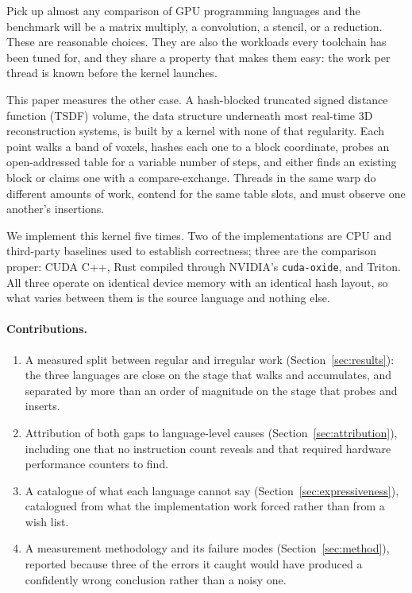 \documentclass[11pt]{article}
\begin{document}
Pick up almost any comparison of GPU programming languages and the benchmark
will be a matrix multiply, a convolution, a stencil, or a reduction. These are
reasonable choices. They are also the workloads every toolchain has been tuned
for, and they share a property that makes them easy: the work per thread is
known before the kernel launches.

This paper measures the other case. A hash-blocked truncated signed distance
function (TSDF) volume, the data structure underneath most real-time 3D
reconstruction systems, is built by a kernel with none of that regularity. Each
point walks a band of voxels, hashes each one to a block coordinate, probes an
open-addressed table for a variable number of steps, and either finds an existing
block or claims one with a compare-exchange. Threads in the same warp do
different amounts of work, contend for the same table slots, and must observe one
another's insertions.

We implement this kernel five times. Two of the implementations are CPU and
third-party baselines used to establish correctness; three are the comparison
proper: CUDA C++, Rust compiled through NVIDIA's \texttt{cuda-oxide}, and
Triton. All three operate on identical device memory with an identical hash
layout, so what varies between them is the source language and nothing else.

\paragraph{Contributions.}
\begin{enumerate}
  \item A measured split between regular and irregular work
        (Section~\ref{sec:results}): the three languages are close on the stage
        that walks and accumulates, and separated by more than an order of
        magnitude on the stage that probes and inserts.
  \item Attribution of both gaps to language-level causes
        (Section~\ref{sec:attribution}), including one that no instruction count
        reveals and that required hardware performance counters to find.
  \item A catalogue of what each language cannot say
        (Section~\ref{sec:expressiveness}), catalogued from what the
        implementation work forced rather than from a wish list.
  \item A measurement methodology and its failure modes
        (Section~\ref{sec:method}), reported because three of the errors it
        caught would have produced a confidently wrong conclusion rather than a
        noisy one.
\end{enumerate}
\end{document}
